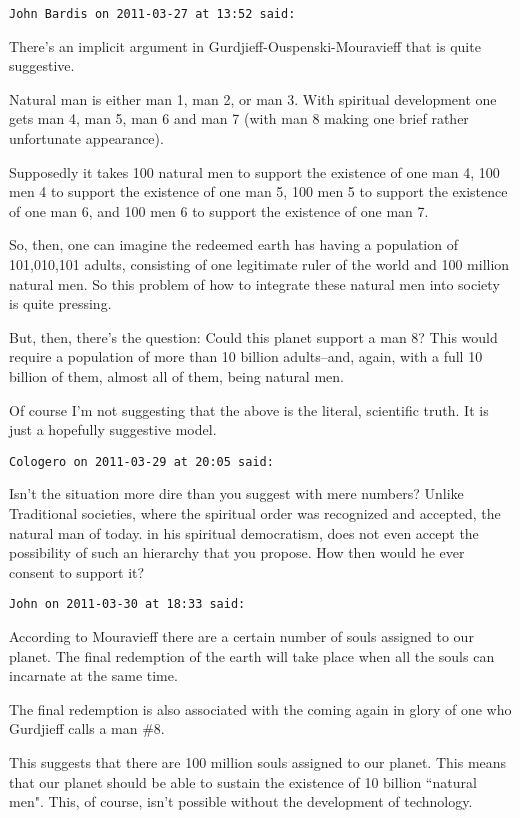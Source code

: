 \begin{footnotesize}
\begin{sffamily}
\hfill

\texttt{John Bardis on 2011-03-27 at 13:52 said: }

There's an implicit argument in Gurdjieff-Ouspenski-Mouravieff that is quite suggestive.

Natural man is either man 1, man 2, or man 3. With spiritual development one gets man 4, man 5, man 6 and man 7 (with man 8 making one brief rather unfortunate appearance).

Supposedly it takes 100 natural men to support the existence of one man 4, 100 men 4 to support the existence of one man 5, 100 men 5 to support the existence of one man 6, and 100 men 6 to support the existence of one man 7.

So, then, one can imagine the redeemed earth has having a population of 101,010,101 adults, consisting of one legitimate ruler of the world and 100 million natural men. So this problem of how to integrate these natural men into society is quite pressing.

But, then, there's the question: Could this planet support a man 8? This would require a population of more than 10 billion adults–and, again, with a full 10 billion of them, almost all of them, being natural men.

Of course I'm not suggesting that the above is the literal, scientific truth. It is just a hopefully suggestive model.


\hfill

\texttt{Cologero on 2011-03-29 at 20:05 said: }

Isn't the situation more dire than you suggest with mere numbers? Unlike Traditional societies, where the spiritual order was recognized and accepted, the natural man of today. in his spiritual democratism, does not even accept the possibility of such an hierarchy that you propose. How then would he ever consent to support it?


\hfill

\texttt{John on 2011-03-30 at 18:33 said: }

According to Mouravieff there are a certain number of souls assigned to our planet. The final redemption of the earth will take place when all the souls can incarnate at the same time.

The final redemption is also associated with the coming again in glory of one who Gurdjieff calls a man \#8. 

This suggests that there are 100 million souls assigned to our planet. This means that our planet should be able to sustain the existence of 10 billion ``natural men". This, of course, isn't possible without the development of technology.


\end{sffamily}
\end{footnotesize}
